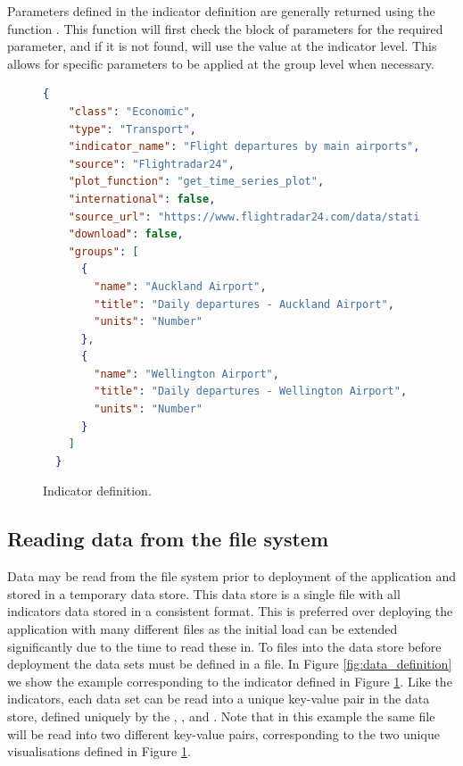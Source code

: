 \documentclass[12pt]{article}
\begin{document}
Parameters defined in the indicator definition are generally returned using the function .  This function will first check the  block of parameters for the required parameter, and if it is not found, will use the value at the indicator level.  This allows for specific parameters to be applied at the group level when necessary.

\begin{figure}[h!]
\footnotesize
\begin{lstlisting}[language=json,firstnumber=1]
  {
    "class": "Economic",
    "type": "Transport",
    "indicator_name": "Flight departures by main airports",
    "source": "Flightradar24",
    "plot_function": "get_time_series_plot",
    "international": false,
    "source_url": "https://www.flightradar24.com/data/statistics",
    "download": false,
    "groups": [
      {
        "name": "Auckland Airport",
        "title": "Daily departures - Auckland Airport",
        "units": "Number"
      },
      {
        "name": "Wellington Airport",
        "title": "Daily departures - Wellington Airport",
        "units": "Number"
      }
    ]
  }
\end{lstlisting}
\caption{Indicator definition.}\label{fig:indicator_definition}
\end{figure}


\subsection*{Reading data from the file system}
Data may be read from the file system prior to deployment of the application and stored in a temporary data store.  This data store is a single file with all indicators data stored in a consistent format.  This is preferred over deploying the application with many different files as the initial load can be extended significantly due to the time to read these in.  To files into the data store before deployment the data sets must be defined in a  file.  In Figure \ref{fig:data_definition} we show the example corresponding to the indicator defined in Figure \ref{fig:indicator_definition}.  Like the indicators, each data set can be read into a unique key-value pair in the data store, defined uniquely by the , ,  and .  Note that in this example the same file will be read into two different key-value pairs, corresponding to the two unique visualisations defined in Figure \ref{fig:indicator_definition}.
\end{document}
